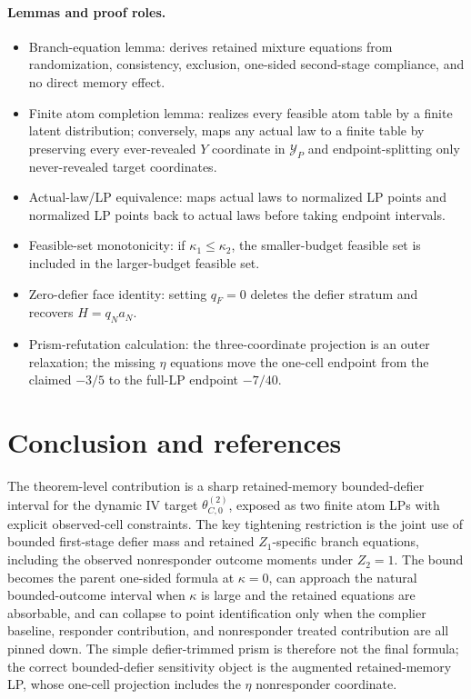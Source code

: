 \documentclass[11pt]{article}
\theoremstyle{definition}
\theoremstyle{plain}
\theoremstyle{remark}
\begin{document}
\paragraph{Lemmas and proof roles.}
\begin{itemize}[leftmargin=*]
\item Branch-equation lemma: derives retained mixture equations from randomization, consistency, exclusion, one-sided second-stage compliance, and no direct memory effect.
\item Finite atom completion lemma: realizes every feasible atom table by a finite latent distribution; conversely, maps any actual law to a finite table by preserving every ever-revealed \(Y\) coordinate in \(\mathcal Y_P\) and endpoint-splitting only never-revealed target coordinates.
\item Actual-law/LP equivalence: maps actual laws to normalized LP points and normalized LP points back to actual laws before taking endpoint intervals.
\item Feasible-set monotonicity: if \(\kappa_1\le\kappa_2\), the smaller-budget feasible set is included in the larger-budget feasible set.
\item Zero-defier face identity: setting \(q_F=0\) deletes the defier stratum and recovers \(H=q_Na_N\).
\item Prism-refutation calculation: the three-coordinate projection is an outer relaxation; the missing \(\eta\) equations move the one-cell endpoint from the claimed \(-3/5\) to the full-LP endpoint \(-7/40\).
\end{itemize}

\section{Conclusion and references}
The theorem-level contribution is a sharp retained-memory bounded-defier interval for the dynamic IV target \(\theta_{C,0}^{(2)}\), exposed as two finite atom LPs with explicit observed-cell constraints.
The key tightening restriction is the joint use of bounded first-stage defier mass and retained \(Z_1\)-specific branch equations, including the observed nonresponder outcome moments under \(Z_2=1\).
The bound becomes the parent one-sided formula at \(\kappa=0\), can approach the natural bounded-outcome interval when \(\kappa\) is large and the retained equations are absorbable, and can collapse to point identification only when the complier baseline, responder contribution, and nonresponder treated contribution are all pinned down.
The simple defier-trimmed prism is therefore not the final formula; the correct bounded-defier sensitivity object is the augmented retained-memory LP, whose one-cell projection includes the \(\eta\) nonresponder coordinate.
\end{document}
